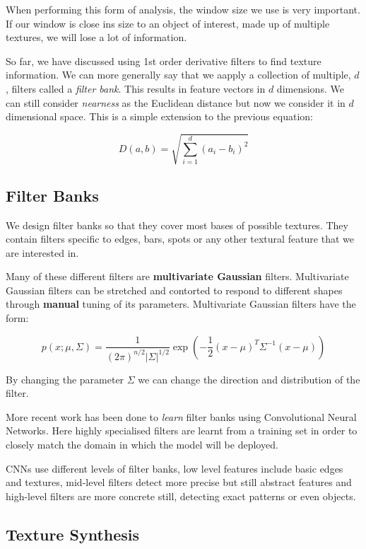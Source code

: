 \documentclass{article}
\begin{document}
When performing this form of analysis, the window size we use is very important. If our window is close ins size to an object of interest, made up of multiple textures, we will lose a lot of information.

So far, we have discussed using 1st order derivative filters to find texture information. We can more generally say that we aapply a collection of multiple, $d$, filters called a \textit{filter bank}. This results in feature vectors in $d$ dimensions. We can still consider \textit{nearness} as the Euclidean distance but now we consider it in $d$ dimensional space. This is a simple extension to the previous equation:

\[
  D(a,b) = \sqrt{\sum_{i=1}^d (a_{i} - b_{i})^2}
\]



\subsection{Filter Banks}

We design filter banks so that they cover most bases of possible textures. They contain filters specific to edges, bars, spots or any other textural feature that we are interested in.

Many of these different filters are \textbf{multivariate Gaussian} filters. Multivariate Gaussian filters can be stretched and contorted to respond to different shapes through \textbf{manual} tuning of its parameters. Multivariate Gaussian filters have the form:

\[
  p(x ; \mu, \Sigma) = \frac{1}{(2\pi)^{n/2}|\Sigma|^{1/2}}\exp\left(-\frac{1}{2}(x-\mu)^{T}\Sigma^{-1}(x-\mu)\right)
\]

By changing the parameter $\Sigma$ we can change the direction and distribution of the filter.

More recent work has been done to \textit{learn} filter banks using Convolutional Neural Networks. Here highly specialised filters are learnt from a training set in order to closely match the domain in which the model will be deployed.

CNNs use different levels of filter banks, low level features include basic edges and textures, mid-level filters detect more precise but still abstract features and high-level filters are more concrete still, detecting exact patterns or even objects.

\subsection{Texture Synthesis}
\end{document}
